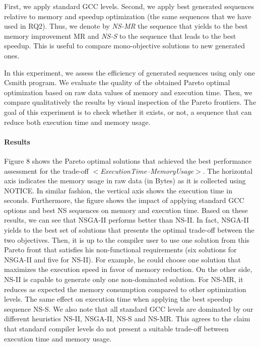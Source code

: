 	First, we apply standard GCC levels. Second, we apply best generated sequences relative to memory and speedup optimization (the same sequences that we have used in RQ2). Thus, we denote by \textit{NS-MR} the sequence that yields to the best memory improvement MR and \textit{NS-S} to the sequence that leads to the best speedup. This is useful to compare mono-objective solutions to new generated ones.
	
	
	
	In this experiment, we assess the efficiency of generated sequences using only one Csmith program.
	We evaluate the quality of the obtained Pareto optimal optimization based on raw data values of memory and execution time. Then, we compare qualitatively the results by visual inspection of the Pareto frontiers.
	The goal of this experiment is to check whether it exists, or not, a sequence that can reduce both execution time and memory usage.
	
	
	
	\paragraph{Results}
	Figure 8 shows the Pareto optimal solutions that achieved the best performance assessment for the trade-off \textit{$<$ExecutionTime--MemoryUsage$>$}. The horizontal axis indicates the memory usage in raw data (in Bytes) as it is collected using NOTICE. In similar fashion, the vertical axis shows the execution time in seconds. Furthermore, the figure shows the impact of applying standard GCC options and best NS sequences on memory and execution time. Based on these results, we can see that NSGA-II performs better than NS-II. In fact, NSGA-II yields to the best set of solutions that presents the optimal trade-off between the two objectives. Then, it is up to the compiler user to use one solution from this Pareto front that satisfies his non-functional requirements (six solutions for NSGA-II and five for NS-II). For example, he could choose one solution that maximizes the execution speed in favor of memory reduction. On the other side, NS-II is capable to generate only one non-dominated solution. For NS-MR, it reduces as expected the memory consumption compared to other optimization levels. The same effect on execution time when applying the best speedup sequence NS-S. We also note that all standard GCC levels are dominated by our different heuristics NS-II, NSGA-II, NS-S and NS-MR.
	This agrees to the claim that standard compiler levels do not present a suitable trade-off between execution time and memory usage.
	

